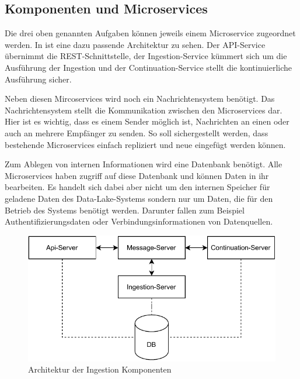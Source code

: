 \subsection{Komponenten und Microservices}
Die drei oben genannten Aufgaben können jeweils einem Microservice zugeordnet werden.
In  ist eine dazu passende Architektur zu sehen.
Der API-Service übernimmt die REST-Schnittstelle, der Ingestion-Service kümmert sich um die Ausführung der Ingestion und der Continuation-Service stellt die kontinuierliche Ausführung sicher.

Neben diesen Mircoservices wird noch ein Nachrichtensystem benötigt.
Das Nachrichtensystem stellt die Kommunikation zwischen den Microservices dar.
Hier ist es wichtig, dass es einem Sender möglich ist, Nachrichten an einen oder auch an mehrere Empfänger zu senden.
So soll sichergestellt werden, dass bestehende Microservices einfach repliziert und neue eingefügt werden können.

Zum Ablegen von internen Informationen wird eine Datenbank benötigt.
Alle Microservices haben zugriff auf diese Datenbank und können Daten in ihr bearbeiten.
Es handelt sich dabei aber nicht um den internen Speicher für geladene Daten des Data-Lake-Systems sondern nur um Daten, die für den Betrieb des Systems benötigt werden.
Darunter fallen zum Beispiel Authentifizierungsdaten oder Verbindungsinformationen von Datenquellen.

\begin{figure}
  \centering
  \includegraphics{Grafiken/ingestion-arch.pdf}
  \caption{Architektur der Ingestion Komponenten}
  \label{fig:ingestion_arch}
\end{figure}
